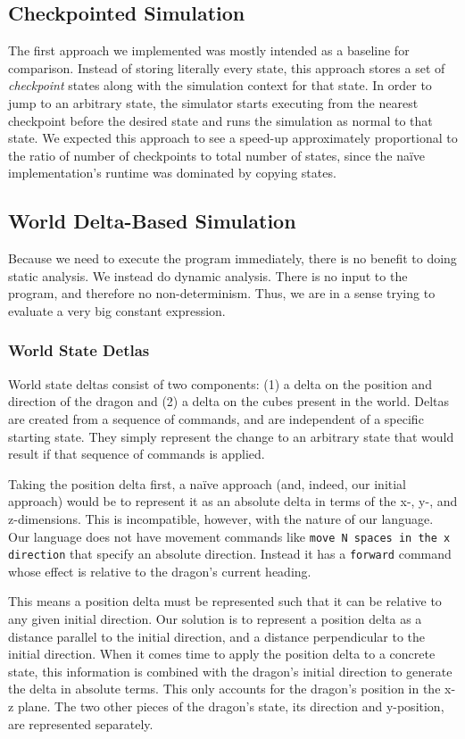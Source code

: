 \documentclass{sig-alternate}
\begin{document}
\subsection{Checkpointed Simulation}
The first approach we implemented was mostly intended as a baseline for comparison. Instead of storing literally every state, this approach stores a set of \emph{checkpoint} states along with the simulation context for that state. In order to jump to an arbitrary state, the simulator starts executing from the nearest checkpoint before the desired state and runs the simulation as normal to that state. We expected this approach to see a speed-up approximately proportional to the ratio of number of checkpoints to total number of states, since the na\"{i}ve implementation's runtime was dominated by copying states.

\subsection{World Delta-Based Simulation}
Because we need to execute the program immediately, there is no benefit to doing static analysis. We instead do dynamic analysis. There is no input to the program, and therefore no non-determinism. Thus, we are in a sense trying to evaluate a very big constant expression.

\subsubsection{World State Detlas}

World state deltas consist of two components: (1) a delta on the position and direction of the dragon and (2) a delta on the cubes present in the world. Deltas are created from a sequence of commands, and are independent of a specific starting state. They simply represent the change to an arbitrary state that would result if that sequence of commands is applied. 

Taking the position delta first, a na\"{i}ve approach (and, indeed, our initial approach) would be to represent it as an absolute delta in terms of the x-, y-, and z-dimensions. This is incompatible, however, with the nature of our language. Our language does not have movement commands like \texttt{move N spaces in the x direction} that specify an absolute direction. Instead it has a \texttt{forward} command whose effect is relative to the dragon's current heading. 

This means a position delta must be represented such that it can be relative to any given initial direction. Our solution is to represent a position delta as a distance parallel to the initial direction, and a distance perpendicular to the initial direction. When it comes time to apply the position delta to a concrete state, this information is combined with the dragon's initial direction to generate the delta in absolute terms. This only accounts for the dragon's position in the x-z plane. The two other pieces of the dragon's state, its direction and y-position, are represented separately. 
\end{document}
